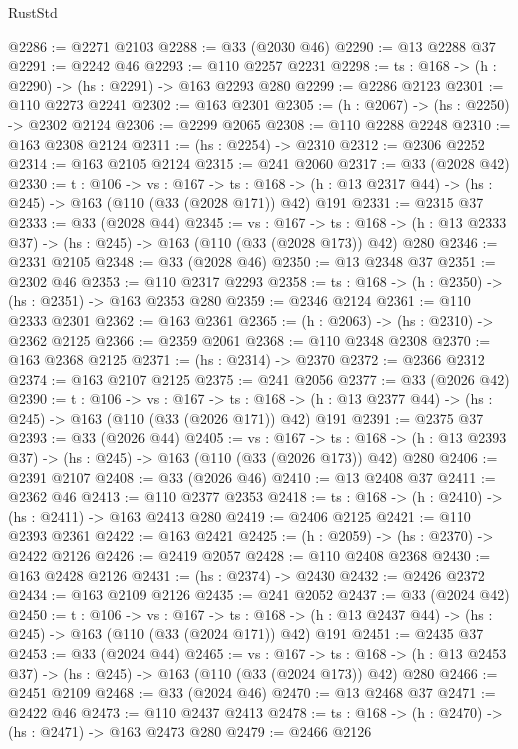 \begin{lexlean}{RustStd}
\begin{coremodule}
@2286 := @2271 @2103
@2288 := @33 (@2030 @46)
@2290 := @13 @2288 @37
@2291 := @2242 @46
@2293 := @110 @2257 @2231
@2298 := {ts : @168} -> (h : @2290) -> (hs : @2291) -> @163 @2293 @280
@2299 := @2286 @2123
@2301 := @110 @2273 @2241
@2302 := @163 @2301
@2305 := (h : @2067) -> (hs : @2250) -> @2302 @2124
@2306 := @2299 @2065
@2308 := @110 @2288 @2248
@2310 := @163 @2308 @2124
@2311 := (hs : @2254) -> @2310
@2312 := @2306 @2252
@2314 := @163 @2105 @2124
@2315 := @241 @2060
@2317 := @33 (@2028 @42)
@2330 := {t : @106} ->
  {vs : @167} ->
  {ts : @168} -> (h : @13 @2317 @44) -> (hs : @245) -> @163 (@110 (@33 (@2028 @171)) @42) @191
@2331 := @2315 @37
@2333 := @33 (@2028 @44)
@2345 := {vs : @167} ->
  {ts : @168} -> (h : @13 @2333 @37) -> (hs : @245) -> @163 (@110 (@33 (@2028 @173)) @42) @280
@2346 := @2331 @2105
@2348 := @33 (@2028 @46)
@2350 := @13 @2348 @37
@2351 := @2302 @46
@2353 := @110 @2317 @2293
@2358 := {ts : @168} -> (h : @2350) -> (hs : @2351) -> @163 @2353 @280
@2359 := @2346 @2124
@2361 := @110 @2333 @2301
@2362 := @163 @2361
@2365 := (h : @2063) -> (hs : @2310) -> @2362 @2125
@2366 := @2359 @2061
@2368 := @110 @2348 @2308
@2370 := @163 @2368 @2125
@2371 := (hs : @2314) -> @2370
@2372 := @2366 @2312
@2374 := @163 @2107 @2125
@2375 := @241 @2056
@2377 := @33 (@2026 @42)
@2390 := {t : @106} ->
  {vs : @167} ->
  {ts : @168} -> (h : @13 @2377 @44) -> (hs : @245) -> @163 (@110 (@33 (@2026 @171)) @42) @191
@2391 := @2375 @37
@2393 := @33 (@2026 @44)
@2405 := {vs : @167} ->
  {ts : @168} -> (h : @13 @2393 @37) -> (hs : @245) -> @163 (@110 (@33 (@2026 @173)) @42) @280
@2406 := @2391 @2107
@2408 := @33 (@2026 @46)
@2410 := @13 @2408 @37
@2411 := @2362 @46
@2413 := @110 @2377 @2353
@2418 := {ts : @168} -> (h : @2410) -> (hs : @2411) -> @163 @2413 @280
@2419 := @2406 @2125
@2421 := @110 @2393 @2361
@2422 := @163 @2421
@2425 := (h : @2059) -> (hs : @2370) -> @2422 @2126
@2426 := @2419 @2057
@2428 := @110 @2408 @2368
@2430 := @163 @2428 @2126
@2431 := (hs : @2374) -> @2430
@2432 := @2426 @2372
@2434 := @163 @2109 @2126
@2435 := @241 @2052
@2437 := @33 (@2024 @42)
@2450 := {t : @106} ->
  {vs : @167} ->
  {ts : @168} -> (h : @13 @2437 @44) -> (hs : @245) -> @163 (@110 (@33 (@2024 @171)) @42) @191
@2451 := @2435 @37
@2453 := @33 (@2024 @44)
@2465 := {vs : @167} ->
  {ts : @168} -> (h : @13 @2453 @37) -> (hs : @245) -> @163 (@110 (@33 (@2024 @173)) @42) @280
@2466 := @2451 @2109
@2468 := @33 (@2024 @46)
@2470 := @13 @2468 @37
@2471 := @2422 @46
@2473 := @110 @2437 @2413
@2478 := {ts : @168} -> (h : @2470) -> (hs : @2471) -> @163 @2473 @280
@2479 := @2466 @2126

\end{coremodule}
\end{lexlean}
